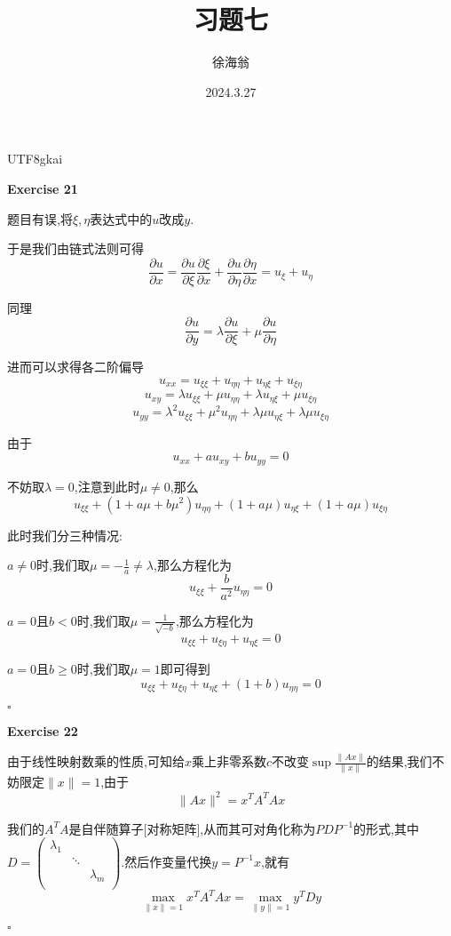 \documentclass[11pt,hyperref,a4paper,UTF8]{ctexart}
\title{习题七}
\author{徐海翁}
\date{2024.3.27}
\newenvironment{exercise}[1]{%
{\textbf{Exercise #1} \\ 
    }
}{
  \hfill $\square$ 
  \par\bigskip 
}
\begin{document}
\begin{CJK}{UTF8}{gkai}

\maketitle

\begin{exercise}{21}
    题目有误,将$\xi,\eta$表达式中的$u$改成$y$.

    于是我们由链式法则可得
    \[\frac{\partial u}{\partial x} = \frac{\partial u}{\partial \xi} \frac{\partial \xi}{\partial x} + \frac{\partial u}{\partial \eta} \frac{\partial \eta}{\partial x} = u_\xi + u_\eta\]

    同理
    \[\frac{\partial u}{\partial y} = \lambda \frac{\partial u}{\partial \xi} + \mu \frac{\partial u}{\partial \eta}\]

    进而可以求得各二阶偏导
    \[u_{xx} = u_{\xi\xi} + u_{\eta\eta} + u_{\eta\xi} + u_{\xi\eta}\]
    \[u_{xy} = \lambda u_{\xi\xi} +\mu u_{\eta\eta} +\lambda u_{\eta\xi} +\mu u_{\xi\eta}\]
    \[u_{yy} = \lambda^2 u_{\xi\xi} +\mu^2 u_{\eta\eta} +\lambda \mu u_{\eta\xi} +\lambda \mu u_{\xi\eta}\]

    由于
    \[u_{xx} + au_{xy} + bu_{yy} = 0\]

    不妨取$\lambda = 0$,注意到此时$\mu \neq 0$,那么
    \[u_{\xi\xi} + (1 + a\mu + b\mu^2) u_{\eta\eta} + (1 + a\mu)u_{\eta\xi} + (1 + a\mu)u_{\xi\eta}\]
    
    此时我们分三种情况:

    $a \neq 0$时,我们取$\mu = -\frac{1}{a} \neq \lambda$,那么方程化为
    \[u_{\xi\xi} + \frac{b}{a^2} u_{\eta\eta} = 0\]

    $a = 0$且$b < 0$时,我们取$\mu = \frac{1}{\sqrt{-b}}$,那么方程化为
    \[u_{\xi\xi} + u_{\xi\eta} + u_{\eta\xi} = 0\]

    $a = 0$且$b \geq 0$时,我们取$\mu = 1$即可得到
    \[u_{\xi\xi} + u_{\xi\eta} + u_{\eta\xi} + (1 + b) u_{\eta\eta}= 0\]
\end{exercise}

\begin{exercise}{22}
    由于线性映射数乘的性质,可知给$x$乘上非零系数$c$不改变$\sup\frac{\|Ax\|}{\|x\|}$的结果,我们不妨限定$\|x\| = 1$,由于
    \[\|Ax\|^2 = x^T A^T A x\]

    我们的$A^T A$是自伴随算子[对称矩阵],从而其可对角化称为$PDP^{-1}$的形式,其中$D = \begin{pmatrix}
        \lambda_1&&\\
        &\ddots&\\
        &&\lambda_m\\
    \end{pmatrix}$.然后作变量代换$y = P^{-1}x$,就有
    \[\max_{\|x\| = 1} x^T A^T A x = \max_{\|y\| = 1} y^T D y\]


\end{exercise}
\end{CJK}
\end{document}
